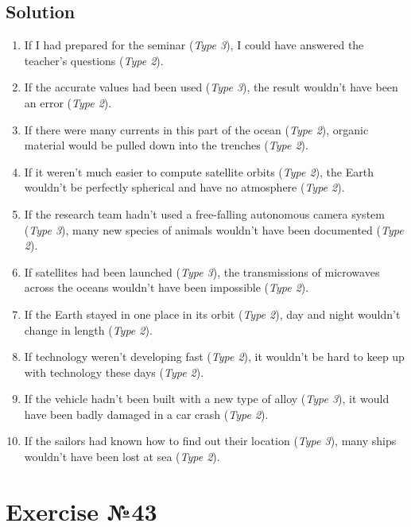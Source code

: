 \subsection*{Solution}
\begin{enumerate}
      \item If I had prepared for the seminar (\textit{Type 3}), I could have answered the teacher’s questions (\textit{Type 2}).
      \item If the accurate values had been used (\textit{Type 3}), the result wouldn't have been an error (\textit{Type 2}).
      \item If there were many currents in this part of the ocean (\textit{Type 2}), organic material would be pulled down into the trenches (\textit{Type 2}).
      \item If it weren't much easier to compute satellite orbits (\textit{Type 2}), the Earth wouldn't be perfectly spherical and have no atmosphere (\textit{Type 2}).
      \item If the research team hadn't used a free-falling autonomous camera system (\textit{Type 3}), many new species of animals wouldn't have been documented (\textit{Type 2}).
      \item If satellites had been launched (\textit{Type 3}), the transmissions of microwaves across the oceans wouldn't have been impossible (\textit{Type 2}).
      \item If the Earth stayed in one place in its orbit (\textit{Type 2}), day and night wouldn't change in length (\textit{Type 2}).
      \item If technology weren't developing fast (\textit{Type 2}), it wouldn't be hard to keep up with technology these days (\textit{Type 2}).
      \item If the vehicle hadn't been built with a new type of alloy (\textit{Type 3}), it would have been badly damaged in a car crash (\textit{Type 2}).
      \item If the sailors had known how to find out their location (\textit{Type 3}), many ships wouldn't have been lost at sea (\textit{Type 2}).
\end{enumerate}

\section{Exercise №43}
